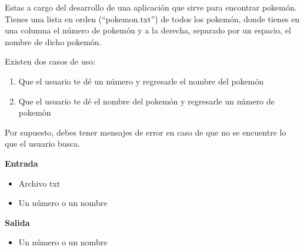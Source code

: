 
\question Estas a cargo del desarrollo de una aplicación que sirve para
          encontrar pokemón. Tienes una lista en orden (“pokemon.txt”)
          de todos los pokemón, donde tienes en una columna el número de
          pokemón y a la derecha, separado por un espacio, el nombre de
          dicho pokemón.

Existen dos casos de uso:
\begin{enumerate}
  \item Que el usuario te dé un número y regresarle el nombre del pokemón
  \item Que el usuario te dé el nombre del pokemón y regresarle un número de
        pokemón
\end{enumerate}

Por supuesto, debes tener mensajes de error en caso de que no se encuentre
lo que el usuario busca.

\textbf{Entrada}

\begin{itemize}
  \item Archivo txt
  \item Un número o un nombre
\end{itemize}

\textbf{Salida}

\begin{itemize}
  \item Un número o un nombre
\end{itemize}
